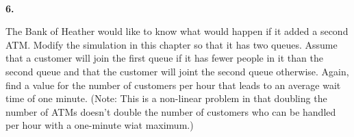 \documentclass[10 pt]{amsart}
\newlength{\cwidth}
\newenvironment{cpart}[2][\cwidth]
	{%
		\\ %
		\textbf{#2. }%
		\begin{minipage}[t]{#1}%
		\setlength{\parindent}{0pt}%
		\setlength{\parskip}{2ex}%
	}
	{%
		\end{minipage}%
	}
\begin{document}
	\begin{cpart}{6}
		The Bank of Heather would like to know what would happen if it 
		added a second ATM.
		Modify the simulation in this chapter so that it has two
		queues.
		Assume that a customer will join the first queue if it has
		fewer people in it than the second queue and that
		the customer will joint the second queue otherwise.
		Again, find a value for the number of customers per hour
		that leads to an average wait time of one minute.
		(Note: This is a non-linear problem in that doubling the
		number of ATMs doesn't double the number of customers who can
		be handled per hour with a one-minute wiat maximum.)
	\end{cpart}
\end{document}
